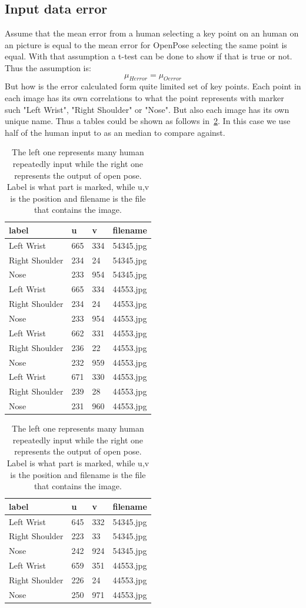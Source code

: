\subsection{Input data error}\label{sub:implment:inputerror}
Assume that the mean error from a human selecting a key point on an human on an picture is equal to the mean error for OpenPose selecting the same point is equal.
With that assumption a t-test can be done to show if that is true or not.
Thus the assumption is:
\[
    \mu_{Herror} = \mu_{Oerror}
\]
But how is the error calculated form quite limited set of key points.
Each point in each image has its own correlations to what the point represents with marker such "Left Wrist", "Right Shoulder" or "Nose".
But also each image has its own unique name.
Thus a tables could be shown as follows in~\ref{tab:impl:input}.
In this case we use half of the human input to as an median to compare against.
\begin{table}[h]
    \centering
    \begin{tabular}{|llll|}
        label & u & v & filename\\
        \hline
        Left Wrist      & 665 & 334     & 54345.jpg \\
        Right Shoulder  & 234 & 24      & 54345.jpg \\
        Nose            & 233 & 954     & 54345.jpg \\
        Left Wrist      & 665 & 334     & 44553.jpg \\
        Right Shoulder  & 234 & 24      & 44553.jpg \\
        Nose            & 233 & 954     & 44553.jpg \\

        Left Wrist      & 662 & 331     & 44553.jpg \\
        Right Shoulder  & 236 & 22      & 44553.jpg \\
        Nose            & 232 & 959     & 44553.jpg \\
        Left Wrist      & 671 & 330     & 44553.jpg \\
        Right Shoulder  & 239 & 28      & 44553.jpg \\
        Nose            & 231 & 960     & 44553.jpg
    \end{tabular}
    \begin{tabular}{|llll|}
        label & u & v & filename\\
        \hline
        Left Wrist      & 645 & 332     & 54345.jpg \\
        Right Shoulder  & 223 & 33      & 54345.jpg \\
        Nose            & 242 & 924     & 54345.jpg \\
       Left Wrist      & 659 & 351     & 44553.jpg \\
       Right Shoulder  & 226 & 24      & 44553.jpg \\
       Nose            & 250 & 971     & 44553.jpg
    \end{tabular}
    \caption{The left one represents many human repeatedly input while the right one represents the output of open pose. Label is what part is marked, while u,v is the position and filename is the file that contains the image.}
    \label{tab:impl:input}
\end{table}
